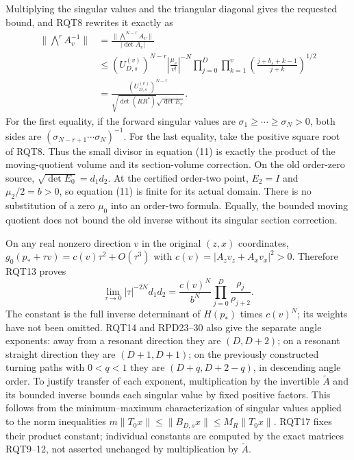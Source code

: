 \documentclass[11pt]{article}
\begin{document}
Multiplying the singular values and the triangular diagonal gives
the requested bound, and RQT8 rewrites it exactly as
\[
\begin{aligned}
 \|\bigwedge^r A_v^{-1}\|
 &=\frac{\|\bigwedge^{N-r} A_v\|}{|\det A_v|}\\
 &\le (U_{D,s}^{(v)})^{N-r}
       \left|\frac{\mu_v}{v!}\right|^{-N}
       \prod_{j=0}^D\prod_{k=1}^v
         \left(\frac{j+b_s+k-1}{j+k}\right)^{1/2}\\
 &=\frac{(U_{D,s}^{(v)})^{N-r}}
       {\sqrt{\det(RR^*)}\sqrt{\det E_v}}.
\end{aligned}\tag{RQT16}
\]
For the first equality, if the forward singular values are
$\sigma_1\ge\cdots\ge\sigma_N>0$, both sides are
$(\sigma_{N-r+1}\cdots\sigma_N)^{-1}$.
For the last equality, take the positive square root of RQT8.
Thus the small divisor in equation (11) is exactly the product
of the moving-quotient volume and its section-volume correction.
On the old order-zero source, $\sqrt{\det E_0}=d_1d_2$.
At the certified order-two point, $E_2=I$ and
$\mu_2/2=b>0$, so equation (11) is finite for its actual domain.
There is no substitution of a zero $\mu_0$ into an order-two
formula.  Equally, the bounded moving quotient does not bound
the old inverse without its singular section correction.

On any real nonzero direction $v$ in the original $(z,x)$
coordinates, $g_0(p_*+\tau v)=c(v)\tau^2+O(\tau^3)$ with
$c(v)=|A_zv_z+A_xv_x|^2>0$.  Therefore RQT13 proves
\[
 \lim_{\tau\to0}|\tau|^{-2N}d_1d_2
 =\frac{c(v)^N}{b^N}\prod_{j=0}^D\frac{\rho_j}{\rho_{j+2}}.
 \tag{RQT17}
\]
The constant is the full inverse determinant of $H(p_*)$
times $c(v)^N$; its weights have not been omitted.
RQT14 and RPD23--30 also give the separate angle exponents:
away from a resonant direction they are $(D,D+2)$;
on a resonant straight direction they are $(D+1,D+1)$;
on the previously constructed turning paths with $0<q<1$
they are $(D+q,D+2-q)$, in descending angle order.
To justify transfer of each exponent, multiplication by the
invertible $\widetilde A$ and its bounded inverse bounds each
singular value by fixed positive factors.  This follows from
the minimum--maximum characterization of singular values applied
to the norm inequalities
$m\|T_0x\|\le\|B_{D,s}x\|\le M_R\|T_0x\|$.
RQT17 fixes their product constant; individual constants are
computed by the exact matrices RQT9--12, not asserted unchanged
by multiplication by $\widetilde A$.
\end{document}
